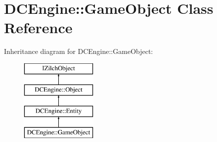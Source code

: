 \hypertarget{classDCEngine_1_1GameObject}{\section{D\-C\-Engine\-:\-:Game\-Object Class Reference}
\label{classDCEngine_1_1GameObject}
}
Inheritance diagram for D\-C\-Engine\-:\-:Game\-Object\-:\begin{figure}[H]
\begin{center}
\leavevmode
\includegraphics[height=4.000000cm]{classDCEngine_1_1GameObject}
\end{center}
\end{figure}
